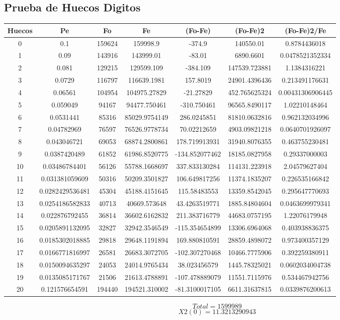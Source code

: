 \documentclass{article}
\begin{document}
\subsection{Prueba de Huecos Digitos}
\begin{tabular}{|c|c|c|c|c|c|c|}
Huecos&Pe&Fo&Fe&(Fo{-}Fe)&(Fo{-}Fe)2&(Fo{-}Fe)2/Fe\\
\hline
0&0.1&159624&159998.9&{-}374.9&140550.01&0.8784436018\\
\hline
1&0.09&143916&143999.01&{-}83.01&6890.6601&0.0478521352334\\
\hline
2&0.081&129215&129599.109&{-}384.109&147539.723881&1.1384316221\\
\hline
3&0.0729&116797&116639.1981&157.8019&24901.4396436&0.213491176631\\
\hline
4&0.06561&104954&104975.27829&{-}21.27829&452.765625324&0.00431306906445\\
\hline
5&0.059049&94167&94477.750461&{-}310.750461&96565.8490117&1.02210148464\\
\hline
6&0.0531441&85316&85029.9754149&286.0245851&81810.0632816&0.962132034996\\
\hline
7&0.04782969&76597&76526.9778734&70.02212659&4903.09821218&0.0640701926097\\
\hline
8&0.043046721&69053&68874.2800861&178.719913931&31940.8076355&0.463755230481\\
\hline
9&0.0387420489&61852&61986.8520775&{-}134.852077462&18185.0827958&0.29337000003\\
\hline
10&0.03486784401&56126&55788.1668697&337.833130284&114131.223918&2.04579627404\\
\hline
11&0.031381059609&50316&50209.3501827&106.649817256&11374.1835207&0.226535166842\\
\hline
12&0.0282429536481&45304&45188.4151645&115.58483553&13359.8542045&0.295647770693\\
\hline
13&0.0254186582833&40713&40669.573648&43.4263519771&1885.84804604&0.0463699979341\\
\hline
14&0.022876792455&36814&36602.6162832&211.383716779&44683.0757195&1.22076179948\\
\hline
15&0.0205891132095&32827&32942.3546549&{-}115.354654899&13306.6964068&0.403938836375\\
\hline
16&0.0185302018885&29818&29648.1191894&169.880810591&28859.4898072&0.973400357129\\
\hline
17&0.0166771816997&26581&26683.3072705&{-}102.307270468&10466.7775906&0.392259380911\\
\hline
18&0.0150094635297&24053&24014.9765434&38.023456579&1445.78325021&0.0602034004738\\
\hline
19&0.0135085171767&21506&21613.4788891&{-}107.478889079&11551.7115976&0.534467942756\\
\hline
20&0.121576654591&194440&194521.310002&{-}81.3100017105&6611.31637815&0.0339876200613\\
\end{tabular}
$$
Total = 1599989
$$
$$
X2(0) = 11.3213290943
$$
\end{document}
